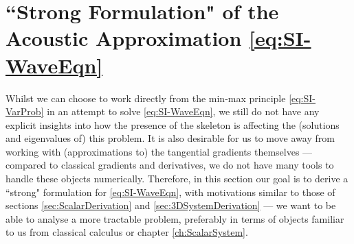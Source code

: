 \section{``Strong Formulation" of the Acoustic Approximation \eqref{eq:SI-WaveEqn}} \label{sec:SI-StrongDerivation}
Whilst we can choose to work directly from the min-max principle \eqref{eq:SI-VarProb} in an attempt to solve \eqref{eq:SI-WaveEqn}, we still do not have any explicit insights into how the presence of the skeleton is affecting the (solutions and eigenvalues of) this problem.
It is also desirable for us to move away from working with (approximations to) the tangential gradients themselves --- compared to classical gradients and derivatives, we do not have many tools to handle these objects numerically.
Therefore, in this section our goal is to derive a ``strong" formulation for \eqref{eq:SI-WaveEqn}, with motivations similar to those of sections \ref{sec:ScalarDerivation} and \ref{sec:3DSystemDerivation} --- we want to be able to analyse a more tractable problem, preferably in terms of objects familiar to us from classical calculus or chapter \ref{ch:ScalarSystem}.

